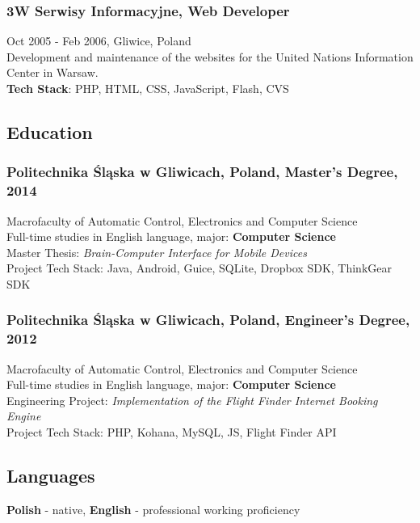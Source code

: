\documentclass{article}
\begin{document}
      \subsubsection*{3W Serwisy Informacyjne, Web Developer}
      Oct 2005 - Feb 2006, Gliwice, Poland\\[0.3em]
      Development and maintenance of the websites for the United Nations Information Center in Warsaw.\\
      \textbf{Tech Stack}: PHP, HTML, CSS, JavaScript, Flash, CVS

    \subsection*{Education}

      \subsubsection*{Politechnika \'Sl\k{a}ska w Gliwicach, Poland, Master's Degree, 2014}
      Macrofaculty of Automatic Control, Electronics and Computer Science\\
      \small{Full-time studies in English language, major: \textbf{Computer Science}}\\
      \small{Master Thesis: \textit{Brain-Computer Interface for Mobile Devices}}\\
      \small{Project Tech Stack: Java, Android, Guice, SQLite, Dropbox SDK, ThinkGear SDK}

      \subsubsection*{Politechnika \'Sl\k{a}ska w Gliwicach, Poland, Engineer's Degree, 2012}
      Macrofaculty of Automatic Control, Electronics and Computer Science\\
      \small{Full-time studies in English language, major: \textbf{Computer Science}}\\
      \small{Engineering Project: \textit{Implementation of the Flight Finder Internet Booking Engine}}\\
      \small{Project Tech Stack: PHP, Kohana, MySQL, JS, Flight Finder API}

    \subsection*{Languages}
    \textbf{Polish} - native, \textbf{English} - professional working proficiency
\end{document}
